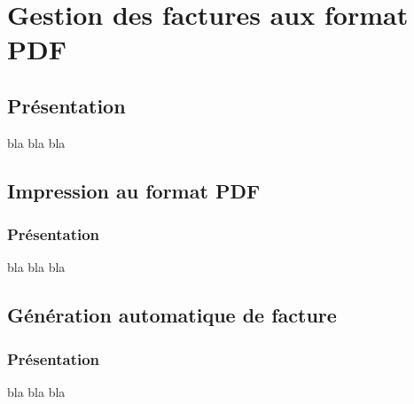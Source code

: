 \chapter{Gestion des factures aux format PDF}
\section{Présentation}
bla bla bla

\section{Impression au format PDF}
\subsection{Présentation}
bla bla bla

\section{Génération automatique de facture}
\subsection{Présentation}
bla bla bla
